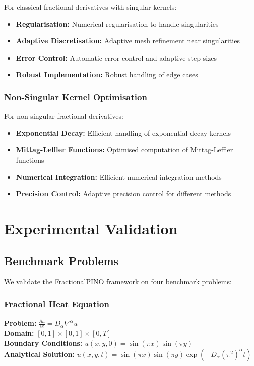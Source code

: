 \documentclass[12pt,a4paper]{article}
\theoremstyle{definition}
\begin{document}
For classical fractional derivatives with singular kernels:

\begin{itemize}
    \item \textbf{Regularisation:} Numerical regularisation to handle singularities
    \item \textbf{Adaptive Discretisation:} Adaptive mesh refinement near singularities
    \item \textbf{Error Control:} Automatic error control and adaptive step sizes
    \item \textbf{Robust Implementation:} Robust handling of edge cases
\end{itemize}

\subsubsection{Non-Singular Kernel Optimisation}

For non-singular fractional derivatives:

\begin{itemize}
    \item \textbf{Exponential Decay:} Efficient handling of exponential decay kernels
    \item \textbf{Mittag-Leffler Functions:} Optimised computation of Mittag-Leffler functions
    \item \textbf{Numerical Integration:} Efficient numerical integration methods
    \item \textbf{Precision Control:} Adaptive precision control for different methods
\end{itemize}

\section{Experimental Validation}
\label{sec:experiments}

\subsection{Benchmark Problems}

We validate the FractionalPINO framework on four benchmark problems:

\subsubsection{Fractional Heat Equation}

\textbf{Problem:} $\frac{\partial u}{\partial t} = D_\alpha \nabla^\alpha u$ \\
\textbf{Domain:} $[0,1] \times [0,1] \times [0,T]$ \\
\textbf{Boundary Conditions:} $u(x,y,0) = \sin(\pi x)\sin(\pi y)$ \\
\textbf{Analytical Solution:} $u(x,y,t) = \sin(\pi x)\sin(\pi y)\exp(-D_\alpha(\pi^2)^\alpha t)$
\end{document}
